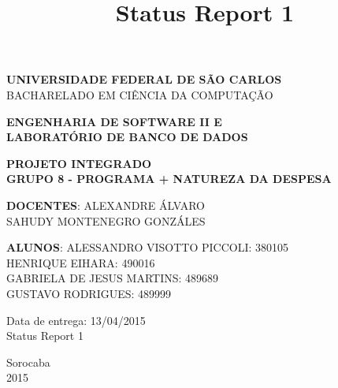 \documentclass[a4paper,12pt]{article}
\title{Status Report 1}
\begin{document}
\renewcommand*\sectionmark[1]{\markboth{#1}{}}
\renewcommand*\subsectionmark[1]{\markboth{#1}{}}


\begin{titlepage}
\begin{center}
{\bf \large UNIVERSIDADE FEDERAL DE SÃO CARLOS}\\[0.2cm]
{\large BACHARELADO EM CIÊNCIA DA COMPUTAÇÃO}\\[0.2cm]

\end{center}

\vfill
\begin{center}
{\bf \large ENGENHARIA DE SOFTWARE II E\\LABORATÓRIO DE BANCO DE DADOS}\\[3.2cm]
\end{center}

\begin{center}
{\bf \LARGE PROJETO INTEGRADO}\\[0.3cm]
{\bf \Large GRUPO 8 - PROGRAMA + NATUREZA DA DESPESA}\\[2.2cm]
\end{center}

\vfill
\begin{flushright}
{\large \textbf{DOCENTES}: ALEXANDRE ÁLVARO}\\[0.2cm]
{\large SAHUDY MONTENEGRO GONZÁLES}\\[0.5cm]
\end{flushright}

\vfill
\begin{flushright}
{\large {\bf ALUNOS}: ALESSANDRO VISOTTO PICCOLI: 380105}\\[0.15cm]
{\large HENRIQUE EIHARA: 490016}\\[0.15cm]
{\large GABRIELA DE JESUS MARTINS: 489689}\\[0.15cm]
{\large GUSTAVO RODRIGUES: 489999}\\[0.15cm]
\end{flushright}

\vfill
\begin{flushright}
{\large Data de entrega: 13/04/2015}\\[0.2cm]
{\large Status Report 1}\\[2.0cm]
\end{flushright}

\begin{center}
{\large Sorocaba}\\[0.2cm]
{\large 2015}
\end{center}

\end{titlepage}
\end{document}
